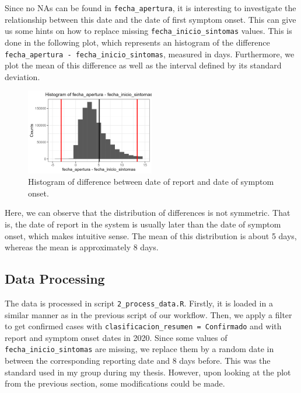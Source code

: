\documentclass[
]{article}
\begin{document}
Since no NAs can be found in \texttt{fecha\_apertura}, it is interesting
to investigate the relationship between this date and the date of first
symptom onset. This can give us some hints on how to replace missing
\texttt{fecha\_inicio\_sintomas} values. This is done in the following
plot, which represents an histogram of the difference
\texttt{fecha\_apertura\ -\ fecha\_inicio\_sintomas}, measured in days.
Furthermore, we plot the mean of this difference as well as the interval
defined by its standard deviation.

\begin{figure}
\centering
\includegraphics[width=0.5\textwidth,height=\textheight]{../figs/dates_diff.png}
\caption{Histogram of difference between date of report and date of
symptom onset.}
\end{figure}

Here, we can observe that the distribution of differences is not
symmetric. That is, the date of report in the system is usually later
than the date of symptom onset, which makes intuitive sense. The mean of
this distribution is about 5 days, whereas the mean is approximately 8
days.

\hypertarget{data-processing}{%
\subsection{Data Processing}\label{data-processing}}

The data is processed in script \texttt{2\_process\_data.R}. Firstly, it
is loaded in a similar manner as in the previous script of our workflow.
Then, we apply a filter to get confirmed cases with
\texttt{clasificacion\_resumen\ =\ Confirmado} and with report and
symptom onset dates in 2020. Since some values of
\texttt{fecha\_inicio\_sintomas} are missing, we replace them by a
random date in between the corresponding reporting date and 8 days
before. This was the standard used in my group during my thesis.
However, upon looking at the plot from the previous section, some
modifications could be made.
\end{document}
